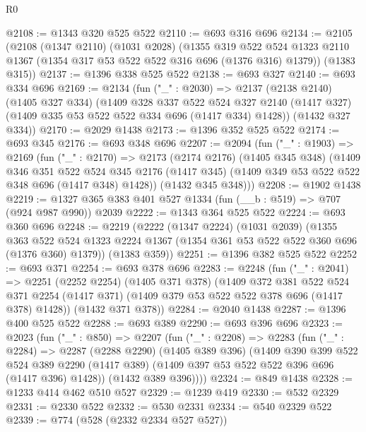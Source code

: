 \begin{lexlean}{R0}
\begin{coremodule}
@2108 := @1343 @320 @525 @522
@2110 := @693 @316 @696
@2134 := @2105
    (@2108
      (@1347 @2110)
      (@1031 @2028)
      (@1355
        @319
        @522
        @524
        @1323
        @2110
        @1367
        (@1354 @317 @53 @522 @522 @316 @696 (@1376 @316) @1379))
      (@1383 @315))
@2137 := @1396 @338 @525 @522
@2138 := @693 @327
@2140 := @693 @334 @696
@2169 := @2134
    (fun ("_" : @2030) =>
    @2137
      (@2138 @2140)
      (@1405 @327 @334)
      (@1409
        @328
        @337
        @522
        @524
        @327
        @2140
        (@1417 @327)
        (@1409 @335 @53 @522 @522 @334 @696 (@1417 @334) @1428))
      (@1432 @327 @334))
@2170 := @2029 @1438
@2173 := @1396 @352 @525 @522
@2174 := @693 @345
@2176 := @693 @348 @696
@2207 := @2094
    (fun ("_" : @1903) =>
    @2169
      (fun ("_" : @2170) =>
      @2173
        (@2174 @2176)
        (@1405 @345 @348)
        (@1409
          @346
          @351
          @522
          @524
          @345
          @2176
          (@1417 @345)
          (@1409 @349 @53 @522 @522 @348 @696 (@1417 @348) @1428))
        (@1432 @345 @348)))
@2208 := @1902 @1438
@2219 := @1327 @365 @383 @401 @527 @1334 (fun (__b : @519) => @707 (@924 @987 @990)) @2039
@2222 := @1343 @364 @525 @522
@2224 := @693 @360 @696
@2248 := @2219
    (@2222
      (@1347 @2224)
      (@1031 @2039)
      (@1355
        @363
        @522
        @524
        @1323
        @2224
        @1367
        (@1354 @361 @53 @522 @522 @360 @696 (@1376 @360) @1379))
      (@1383 @359))
@2251 := @1396 @382 @525 @522
@2252 := @693 @371
@2254 := @693 @378 @696
@2283 := @2248
    (fun ("_" : @2041) =>
    @2251
      (@2252 @2254)
      (@1405 @371 @378)
      (@1409
        @372
        @381
        @522
        @524
        @371
        @2254
        (@1417 @371)
        (@1409 @379 @53 @522 @522 @378 @696 (@1417 @378) @1428))
      (@1432 @371 @378))
@2284 := @2040 @1438
@2287 := @1396 @400 @525 @522
@2288 := @693 @389
@2290 := @693 @396 @696
@2323 := @2023
    (fun ("_" : @850) =>
    @2207
      (fun ("_" : @2208) =>
      @2283
        (fun ("_" : @2284) =>
        @2287
          (@2288 @2290)
          (@1405 @389 @396)
          (@1409
            @390
            @399
            @522
            @524
            @389
            @2290
            (@1417 @389)
            (@1409 @397 @53 @522 @522 @396 @696 (@1417 @396) @1428))
          (@1432 @389 @396))))
@2324 := @849 @1438
@2328 := @1233 @414 @462 @510 @527
@2329 := @1239 @419
@2330 := @532 @2329
@2331 := @2330 @522
@2332 := @530 @2331
@2334 := @540 @2329 @522
@2339 := @774 (@528 (@2332 @2334 @527 @527))

\end{coremodule}
\end{lexlean}
